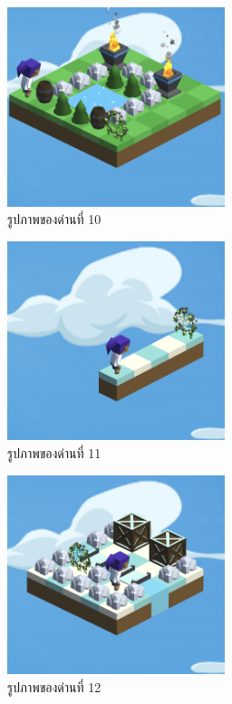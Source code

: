 \begin{figure}[H]
    \begin{center}
    \includegraphics[width=2.5in]{pic-toro/stage/s10.png}
    \end{center}
    \caption[รูปภาพของด่านที่ 10]{รูปภาพของด่านที่ 10}
    \label{s10}
\end{figure}
\begin{figure}[H]
    \begin{center}
    \includegraphics[width=2.5in]{pic-toro/stage/s11.png}
    \end{center}
    \caption[รูปภาพของด่านที่ 11]{รูปภาพของด่านที่ 11}
    \label{s11}
\end{figure}
\begin{figure}[H]
    \begin{center}
    \includegraphics[width=2.5in]{pic-toro/stage/s12.png}
    \end{center}
    \caption[รูปภาพของด่านที่ 12]{รูปภาพของด่านที่ 12}
    \label{s12}
\end{figure}
